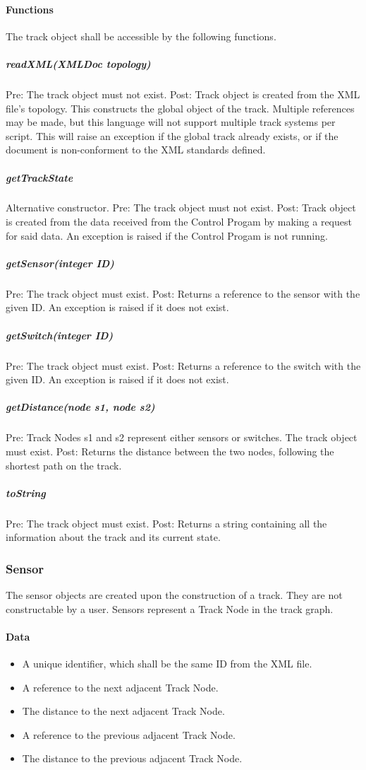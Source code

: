 \documentclass[a4paper,11pt,notitlepage]{article}
\def\CS{Control Progam\xspace}
\def\TN{Track Node\xspace}
\begin{document}
\paragraph{Functions}
The track object shall be accessible by the following functions.
\subparagraph{readXML(XMLDoc topology)} Pre: The track object must not exist. Post: Track object is created from the XML file's topology. This constructs the global object of the track. Multiple references may be made, but this language will not support multiple track systems per script. This will raise an exception if the global track already exists, or if the document is non-conforment to the XML standards defined.
\subparagraph{getTrackState} Alternative constructor. Pre: The track object must not exist. Post: Track object is created from the data received from the \CS by making a request for said data. An exception is raised if the \CS is not running.
\subparagraph{getSensor(integer ID)} Pre: The track object must exist. Post: Returns a reference to the sensor with the given ID. An exception is raised if it does not exist.
\subparagraph{getSwitch(integer ID)} Pre: The track object must exist. Post: Returns a reference to the switch with the given ID. An exception is raised if it does not exist.
\subparagraph{getDistance(node s1, node s2)} Pre: \TN{}s s1 and s2 represent either sensors or switches. The track object must exist. Post: Returns the distance between the two nodes, following the shortest path on the track.
\subparagraph{toString} Pre: The track object must exist. Post: Returns a string containing all the information about the track and its current state.

\subsubsection{Sensor}
The sensor objects are created upon the construction of a track. They are not constructable by a user. Sensors represent a \TN in the track graph.
\paragraph{Data}
\begin{itemize}
\item A unique identifier, which shall be the same ID from the XML file.
\item A reference to the next adjacent \TN.
\item The distance to the next adjacent \TN.
\item A reference to the previous adjacent \TN.
\item The distance to the previous adjacent \TN.
\end{itemize}
\end{document}
